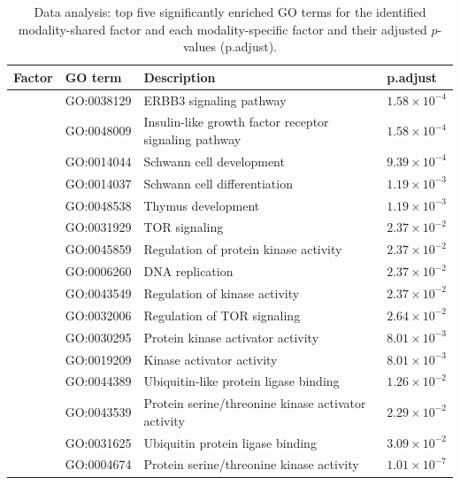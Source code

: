 \begin{table}[htbp]
\centering
\caption{Data analysis: top five significantly enriched GO terms for the identified modality-shared factor and each modality-specific factor and their adjusted $p$-values (p.adjust).}
 \label{tab:GO} 
\renewcommand\tabcolsep{1pt}
\scriptsize
\begingroup
\renewcommand{\arraystretch}{.56}   
\begin{tabular}{p{2.2cm}p{2cm}p{9.5cm}p{2cm}}  
\toprule
\textbf{Factor} & \textbf{GO term} & \textbf{Description} & \textbf{p.adjust} \\
\midrule 
{} & GO:0038129 & ERBB3 signaling pathway & $1.58\times10^{-4}$ \\
 & GO:0048009 & Insulin-like growth factor receptor signaling pathway & $1.58\times10^{-4}$ \\
 & GO:0014044 & Schwann cell development & $9.39\times10^{-4}$ \\
 & GO:0014037 & Schwann cell differentiation & $1.19\times10^{-3}$ \\
 & GO:0048538 & Thymus development & $1.19\times10^{-3}$ \\
\midrule
{} & GO:0031929 & TOR signaling & $2.37\times10^{-2}$ \\
 & GO:0045859 & Regulation of protein kinase activity & $2.37\times10^{-2}$ \\
 & GO:0006260 & DNA replication & $2.37\times10^{-2}$ \\
 & GO:0043549 & Regulation of kinase activity & $2.37\times10^{-2}$ \\
 & GO:0032006 & Regulation of TOR signaling & $2.64\times10^{-2}$ \\
\midrule
{} & GO:0030295 & Protein kinase activator activity & $8.01\times10^{-3}$ \\
 & GO:0019209 & Kinase activator activity & $8.01\times10^{-3}$ \\
 & GO:0044389 & Ubiquitin-like protein ligase binding & $1.26\times10^{-2}$ \\
 & GO:0043539 & Protein serine/threonine kinase activator activity & $2.29\times10^{-2}$ \\
 & GO:0031625 & Ubiquitin protein ligase binding & $3.09\times10^{-2}$ \\
\midrule
{} & GO:0004674 & Protein serine/threonine kinase activity & $1.01\times10^{-7}$ \\

\end{tabular}
\end{table}
